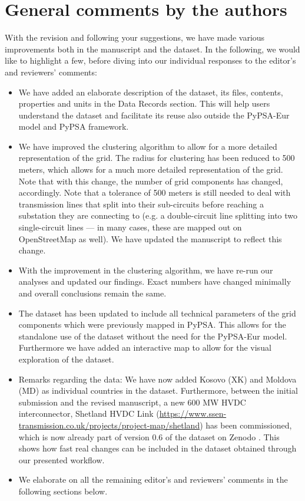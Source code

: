 \documentclass{response}
\begin{document}
\section*{General comments by the authors}
With the revision and following your suggestions, we have made various improvements both in the manuscript and the dataset. In the following, we would like to highlight a few, before diving into our individual responses to the editor's and reviewers' comments:
\begin{itemize}
    \item We have added an elaborate description of the dataset, its files, contents, properties and units in the Data Records section. This will help users understand the dataset and facilitate its reuse also outside the PyPSA-Eur model and PyPSA framework.
    \item We have improved the clustering algorithm to allow for a more detailed representation of the grid. The radius for clustering has been reduced to 500 meters, which allows for a much more detailed representation of the grid. Note that with this change, the number of grid components has changed, accordingly. Note that a tolerance of 500 meters is still needed to deal with transmission lines that split into their sub-circuits before reaching a substation they are connecting to (e.g. a double-circuit line splitting into two single-circuit lines --- in many cases, these are mapped out on OpenStreetMap as well). We have updated the manuscript to reflect this change. 
    \item With the improvement in the clustering algorithm, we have re-run our analyses and updated our findings. Exact numbers have changed minimally and overall conclusions remain the same.
    \item The dataset has been updated to include all technical parameters of the grid components which were previously mapped in PyPSA. This allows for the standalone use of the dataset without the need for the PyPSA-Eur model. Furthermore we have added an interactive map to allow for the visual exploration of the dataset.
    \item Remarks regarding the data: We have now added Kosovo (XK) and Moldova (MD) as individual countries in the dataset. Furthermore, between the initial submission and the revised manuscript, a new 600 MW HVDC interconnector, Shetland HVDC Link (\href{https://www.ssen-transmission.co.uk/projects/project-map/shetland}{https://www.ssen-transmission.co.uk/projects/project-map/shetland}) has been commissioned, which is now already part of version 0.6 of the dataset on Zenodo \cite{xiongPrebuiltElectricityNetwork2024}. This shows how fast real changes can be included in the dataset obtained through our presented workflow.
    \item We elaborate on all the remaining editor's and reviewers' comments in the following sections below. 
\end{itemize}
\end{document}

